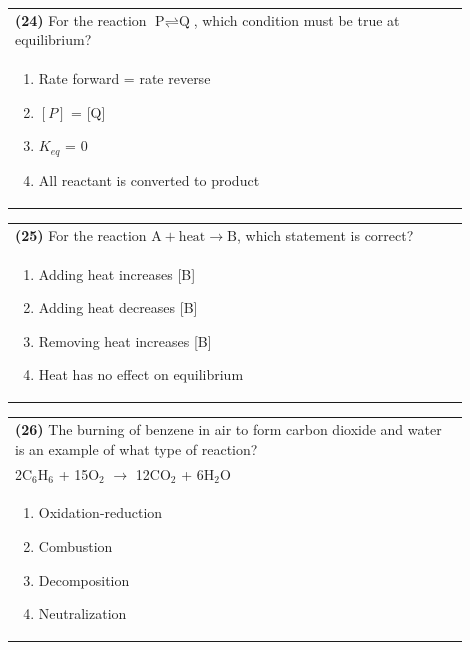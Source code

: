 \documentclass{article}
\begin{document}
\noindent\begin{tabular}{|p{0.9\linewidth}|}
\hline
\textbf{(24)} For the reaction $\text{P} \rightleftharpoons \text{Q}$, which condition must be true at equilibrium?\\[0.2cm]
\begin{minipage}[t]{0.85\linewidth}
\begin{enumerate}[label=\alph*.]
\item Rate forward = rate reverse
\item $[P]$ = [Q]
\item $K_{eq}$ = 0
\item All reactant is converted to product
\end{enumerate}
\end{minipage}\\[0.2cm]
\hline
\end{tabular}
\newpage

\noindent\begin{tabular}{|p{0.9\linewidth}|}
\hline
\textbf{(25)} For the reaction $\text{A} + \text{heat} \rightarrow \text{B}$, which statement is correct? \\[0.2cm]
\begin{minipage}[t]{0.85\linewidth}
\begin{enumerate}[label=\alph*.]
\item Adding heat increases [B]
\item Adding heat decreases [B]
\item Removing heat increases [B]
\item Heat has no effect on equilibrium
\end{enumerate}
\end{minipage}\\[0.2cm]
\hline
\end{tabular}

\noindent\begin{tabular}{|p{0.9\linewidth}|}
\hline
\textbf{(26)} The burning of benzene in air to form carbon dioxide and water is an example of what type of reaction?\\[0.2cm]
2C$_6$H$_6$ + 15O$_2$ $\rightarrow$ 12CO$_2$ + 6H$_2$O\\[0.2cm]
\begin{minipage}[t]{0.85\linewidth}
\begin{enumerate}[label=\alph*.]
\item Oxidation-reduction
\item Combustion
\item Decomposition
\item Neutralization
\end{enumerate}
\end{minipage}\\[0.2cm]
\hline
\end{tabular}
\end{document}
